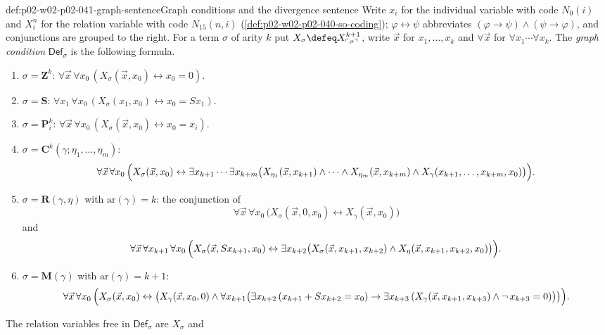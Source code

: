 \begin{hbdefinition}{def:p02-w02-p02-041-graph-sentence}{Graph conditions and the divergence sentence}
Write \(x_i\) for the individual variable with code \(N_0(i)\) and
\(X^n_i\) for the relation variable with code \(N_{15}(n,i)\)
(\cref{def:p02-w02-p02-040-so-coding}); \(\varphi\leftrightarrow\psi\)
abbreviates \((\varphi\to\psi)\land(\psi\to\varphi)\), and
conjunctions are grouped to the right.  For a term \(\sigma\) of arity \(k\)
put \(X_\sigma\defeq X^{k+1}_{\ulcorner\sigma\urcorner}\), write \(\vec x\) for
\(x_1,\ldots,x_k\) and \(\forall\vec x\) for
\(\forall x_1\cdots\forall x_k\).  The \emph{graph condition}
\(\mathsf{Def}_\sigma\) is the following formula.
\begin{enumerate}
 \item \(\sigma=\mathbf Z^k\):\quad
   \(\forall\vec x\,\forall x_0\,(X_\sigma(\vec x,x_0)\leftrightarrow x_0=0)\).
 \item \(\sigma=\mathbf S\):\quad
   \(\forall x_1\,\forall x_0\,(X_\sigma(x_1,x_0)\leftrightarrow x_0=S x_1)\).
 \item \(\sigma=\mathbf P^k_i\):\quad
   \(\forall\vec x\,\forall x_0\,(X_\sigma(\vec x,x_0)\leftrightarrow x_0=x_i)\).
 \item \(\sigma=\mathbf C^k(\gamma;\eta_1,\ldots,\eta_m)\):
   \[
   \forall\vec x\,\forall x_0\,\Bigl(X_\sigma(\vec x,x_0)\leftrightarrow
   \exists x_{k+1}\cdots\exists x_{k+m}\bigl(X_{\eta_1}(\vec x,x_{k+1})\land\cdots\land
   X_{\eta_m}(\vec x,x_{k+m})\land X_\gamma(x_{k+1},\ldots,x_{k+m},x_0)\bigr)\Bigr).
   \]
 \item \(\sigma=\mathbf R(\gamma,\eta)\) with \(\mathrm{ar}(\gamma)=k\): the
   conjunction of
   \[
   \forall\vec x\,\forall x_0\,\bigl(X_\sigma(\vec x,0,x_0)\leftrightarrow X_\gamma(\vec x,x_0)\bigr)
   \]
   and
   \[
   \forall\vec x\,\forall x_{k+1}\,\forall x_0\,\Bigl(X_\sigma(\vec x,S x_{k+1},x_0)\leftrightarrow
   \exists x_{k+2}\bigl(X_\sigma(\vec x,x_{k+1},x_{k+2})\land
   X_\eta(\vec x,x_{k+1},x_{k+2},x_0)\bigr)\Bigr).
   \]
 \item \(\sigma=\mathbf M(\gamma)\) with \(\mathrm{ar}(\gamma)=k+1\):
   \[
   \forall\vec x\,\forall x_0\,\Bigl(X_\sigma(\vec x,x_0)\leftrightarrow
   \bigl(X_\gamma(\vec x,x_0,0)\land\forall x_{k+1}\bigl(\exists x_{k+2}\,(x_{k+1}+S x_{k+2}=x_0)
   \to\exists x_{k+3}\,(X_\gamma(\vec x,x_{k+1},x_{k+3})\land\neg\,x_{k+3}=0)\bigr)\bigr)\Bigr).
   \]
\end{enumerate}
The relation variables free in \(\mathsf{Def}_\sigma\) are \(X_\sigma\) and

\end{hbdefinition}

